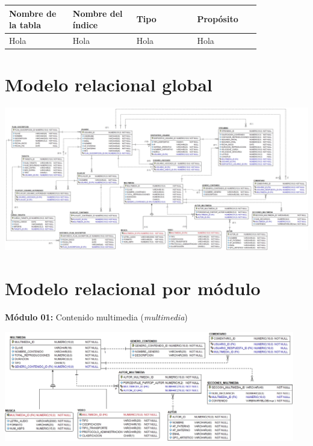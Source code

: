 \documentclass{article}
\def\arraystretch{1}
\begin{document}
{
  \setlength\tabcolsep{3.5mm}
  \def\arraystretch{2}          %
  \begin{longtable}{
    |p{0.21\linewidth}
    |p{0.21\linewidth}
    |p{0.2\linewidth}
    |p{0.21\linewidth}|}
  \hline
  \textbf{Nombre de la tabla} & 
  \textbf{Nombre del índice} & 
  \textbf{Tipo} & 
  \textbf{Propósito}
  \\ \hline
  Hola &
  Hola &
  Hola &
  Hola%
  \\ \hline
  \end{longtable}
}


\section*{Modelo relacional global}

\begin{center}
\includegraphics[width=0.95\textheight,angle=90]{media-stream-modelo-global}
\end{center}


\section*{Modelo relacional por módulo}

\textbf{Módulo 01:} Contenido multimedia (\textit{multimedia})

\begin{center}
\includegraphics[width=0.95\textwidth]{media-stream-modulo-01}
\end{center}
\end{document}
